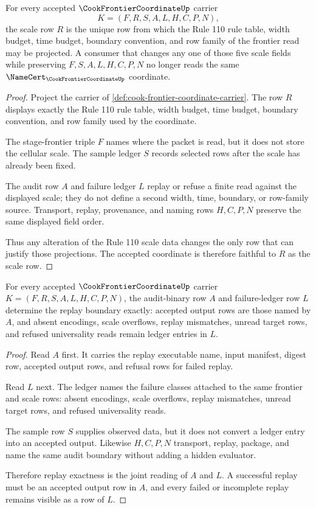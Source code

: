 \begin{theorem}
\label{thm:cook-frontier-coordinate-scale-row-faithfulness}
For every accepted $\CookFrontierCoordinateUp$ carrier
$$
K=(F,R,S,A,L,H,C,P,N),
$$
the scale row $R$ is the unique row from which the Rule 110 rule table, width budget, time budget, boundary convention, and row family of the frontier read may be projected. A consumer that changes any one of those five scale fields while preserving $F,S,A,L,H,C,P,N$ no longer reads the same $\NameCert_{\CookFrontierCoordinateUp}$ coordinate.
\end{theorem}
\begin{proof}
Project the carrier of \autoref{def:cook-frontier-coordinate-carrier}. The row $R$ displays exactly the Rule 110 rule table, width budget, time budget, boundary convention, and row family used by the coordinate.

The stage-frontier triple $F$ names where the packet is read, but it does not store the cellular scale. The sample ledger $S$ records selected rows after the scale has already been fixed.

The audit row $A$ and failure ledger $L$ replay or refuse a finite read against the displayed scale; they do not define a second width, time, boundary, or row-family source. Transport, replay, provenance, and naming rows $H,C,P,N$ preserve the same displayed field order.

Thus any alteration of the Rule 110 scale data changes the only row that can justify those projections. The accepted coordinate is therefore faithful to $R$ as the scale row.
\end{proof}

\begin{theorem}
\label{thm:cook-frontier-coordinate-audit-replay-exactness}
For every accepted $\CookFrontierCoordinateUp$ carrier $K=(F,R,S,A,L,H,C,P,N)$, the audit-binary row $A$ and failure-ledger row $L$ determine the replay boundary exactly: accepted output rows are those named by $A$, and absent encodings, scale overflows, replay mismatches, unread target rows, and refused universality reads remain ledger entries in $L$.
\end{theorem}
\begin{proof}
Read $A$ first. It carries the replay executable name, input manifest, digest row, accepted output rows, and refusal rows for failed replay.

Read $L$ next. The ledger names the failure classes attached to the same frontier and scale rows: absent encodings, scale overflows, replay mismatches, unread target rows, and refused universality reads.

The sample row $S$ supplies observed data, but it does not convert a ledger entry into an accepted output. Likewise $H,C,P,N$ transport, replay, package, and name the same audit boundary without adding a hidden evaluator.

Therefore replay exactness is the joint reading of $A$ and $L$. A successful replay must be an accepted output row in $A$, and every failed or incomplete replay remains visible as a row of $L$.
\end{proof}

